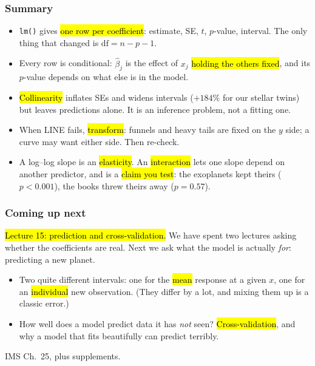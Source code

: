 \documentclass[slidestop,compress,mathserif]{beamer}
\begin{document}
\begin{frame}
\frametitle{Summary}

\begin{itemize}
\item \texttt{lm()} gives \hl{one row per coefficient}: estimate, SE, $t$, $p$-value, interval. The only thing that changed is $\mathrm{df} = n-p-1$.
\item Every row is conditional: $\hat\beta_j$ is the effect of $x_j$ \hl{holding the others fixed}, and its $p$-value depends on what else is in the model.
\item \hl{Collinearity} inflates SEs and widens intervals ($+184\%$ for our stellar twins) but leaves predictions alone. It is an inference problem, not a fitting one.
\item When LINE fails, \hl{transform}: funnels and heavy tails are fixed on the $y$ side; a curve may want either side. Then re-check.
\item A log--log slope is an \hl{elasticity}. An \hl{interaction} lets one slope depend on another predictor, and is a \hl{claim you test}: the exoplanets kept theirs ($p<0.001$), the books threw theirs away ($p=0.57$).
\end{itemize}

\end{frame}


\begin{frame}
\frametitle{Coming up next}

\hl{Lecture 15: prediction and cross-validation.} We have spent two lectures asking whether the coefficients are real. Next we ask what the model is actually \emph{for}: predicting a new planet.

\vspace{0.4em}
\begin{itemize}
\item Two quite different intervals: one for the \hl{mean} response at a given $x$, one for an \hl{individual} new observation. (They differ by a lot, and mixing them up is a classic error.)
\item How well does a model predict data it has \emph{not} seen? \hl{Cross-validation}, and why a model that fits beautifully can predict terribly.
\end{itemize}

\vspace{0.4em}
{\small IMS Ch.\ 25, plus supplements.}

\end{frame}
\end{document}
